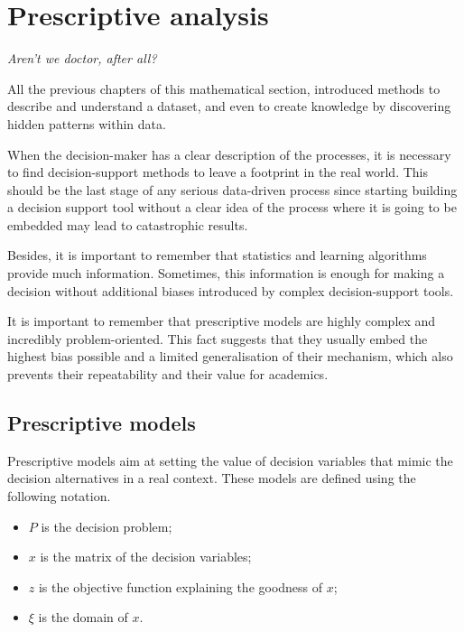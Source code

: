 \chapter{Prescriptive analysis}{}

\epigraph{\textit{Aren’t we doctor, after all?}}{}

All the previous chapters of this mathematical section, introduced methods to describe and understand a dataset, and even to create knowledge by discovering hidden patterns within data.\par

When the decision-maker has a clear description of the processes, it is necessary to find decision-support methods to leave a footprint in the real world. This should be the last stage of any serious data-driven process since starting building a decision support tool without a clear idea of the process where it is going to be embedded may lead to catastrophic results.\par

Besides, it is important to remember that statistics and learning algorithms provide much information. Sometimes, this information is enough for making a decision without additional biases introduced by complex decision-support tools.\par

It is important to remember that prescriptive models are highly complex and incredibly problem-oriented. This fact suggests that they usually embed the highest bias possible and a limited generalisation of their mechanism, which also prevents their repeatability and their value for academics.\par

\section{Prescriptive models}
Prescriptive models aim at setting the value of decision variables that mimic the decision alternatives in a real context. These models are defined using the following notation.

\begin{itemize}
    \item $P$ is the decision problem;
    \item $x$ is the matrix of the decision variables;
    \item $z$ is the objective function explaining the goodness of $x$;
    \item $\xi$ is the domain of $x$.
\end{itemize}

